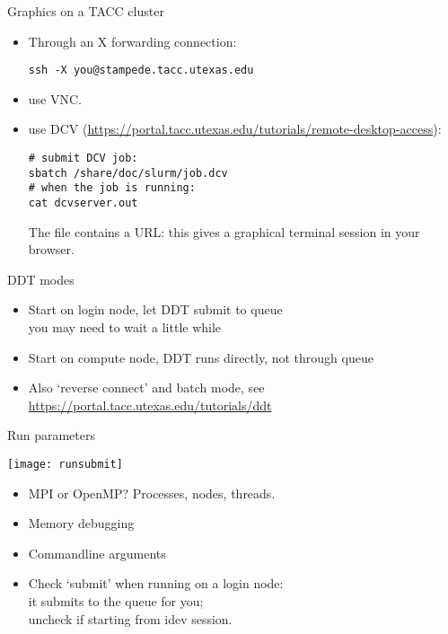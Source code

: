 \documentclass[11pt,headernav]{beamer}
\newcounter{tacc}
\begin{document}
\begin{frame}[containsverbatim]{Graphics on a TACC cluster}
  \begin{itemize}
  \item
    Through an X forwarding connection:
\begin{verbatim}
ssh -X you@stampede.tacc.utexas.edu
\end{verbatim}
\item  use VNC.
\item use DCV
  (\url{https://portal.tacc.utexas.edu/tutorials/remote-desktop-access}):
\begin{verbatim}
# submit DCV job:
sbatch /share/doc/slurm/job.dcv
# when the job is running:
cat dcvserver.out
\end{verbatim}
The  file contains a URL: this gives a graphical terminal session
in your browser.
  \end{itemize}
\end{frame}

\begin{frame}{DDT modes}
  \begin{itemize}
  \item Start on login node, let DDT submit to queue\\
    you may need to wait a little while
  \item Start on compute node, DDT runs directly, not through queue
  \item Also `reverse connect' and batch mode, see
    \url{https://portal.tacc.utexas.edu/tutorials/ddt}
  \end{itemize}
\end{frame}

\begin{frame}[containsverbatim]{Run parameters}
  \begin{multicols}{2}
    \texttt{[image: runsubmit]}
    \columnbreak
    \begin{itemize}
    \item MPI or OpenMP? Processes, nodes, threads.
    \item Memory debugging
    \item Commandline arguments
    \item Check `submit' when running on a login node:\\
      it submits to the queue for you;\\
      uncheck if starting from idev session.
    \end{itemize}
  \end{multicols}
\end{frame}
\end{document}
